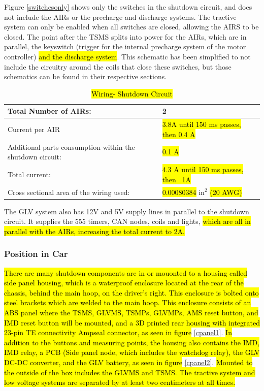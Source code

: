 \documentclass{article}
\DeclareRobustCommand{\hlr}[1]{{\sethlcolor{red}\hl{#1}}}
\begin{document}
            Figure \ref{switchesonly} shows only the switches in the shutdown circuit, and does not include the AIRs or the precharge and discharge systems. The tractive system can only be enabled when all switches are closed, allowing the AIRS to be closed. The point after the TSMS splits into power for the AIRs, which are in parallel, the keyswitch (trigger for the internal precharge system of the motor controller) \hlr{and the discharge system}. This schematic has been simplified to not include the circuitry around the coils that close these switches, but those schematics can be found in their respective sections.

            \begin{table}[H]
                \centering
                \begin{tabular}{|l|l|}
                \hline
                    Total Number of AIRs: & 2 \\ \hline
                    Current per AIR & \hlr{ 3.8A until 150 ms passes, then 0.4 A} \\ \hline
                    Additional parts consumption within the shutdown circuit: & \hlr{0.1 A }\\ \hline
                    Total current: & \hlr{4.3 A until 150 ms passes, then ~1A} \\ \hline
                    Cross sectional area of the wiring used: & \hlr{0.00080384} in$^{2}$ \hlr{(20 AWG)} \\ \hline
                \end{tabular}
                \caption{\hlr{Wiring- Shutdown Circuit}}
                \label{ShutdownCircuitTable}
            \end{table}

            The GLV system also has 12V and 5V supply lines in parallel to the shutdown circuit. It supplies the 555 timers, CAN nodes, coils and lights, \hlr{ which are all in parallel with the AIRs, increasing the total current to 2A. }

        \subsubsection{Position in Car}

        \hlr{There are many shutdown components are in or mouonted to a housing called side panel housing, which is a waterproof enclosure located at the rear of the chassis, behind the main hoop, on the driver's right.  This enclosure is bolted onto steel brackets which are welded to the main hoop.  This enclosure consists of an ABS panel where the TSMS, GLVMS, TSMPs, GLVMPs, AMS reset button, and IMD reset button will be mounted, and a 3D printed rear housing with integrated 23-pin TE connectivity Ampseal connector, as seen in figure} \ref{cpanel1}. \hlr{In addition to the buttons and measuring points, the housing also contains the IMD, IMD relay, a PCB (Side panel node, which includes the watchdog relay), the GLV DC-DC converter, and the GLV battery, as seen in figure} \ref{cpanel2}.  \hlr{Mounted to the outside of the box includes the GLVMS and TSMS. The tractive system and low voltage systems are separated by at least two centimeters at all times.}
\end{document}

